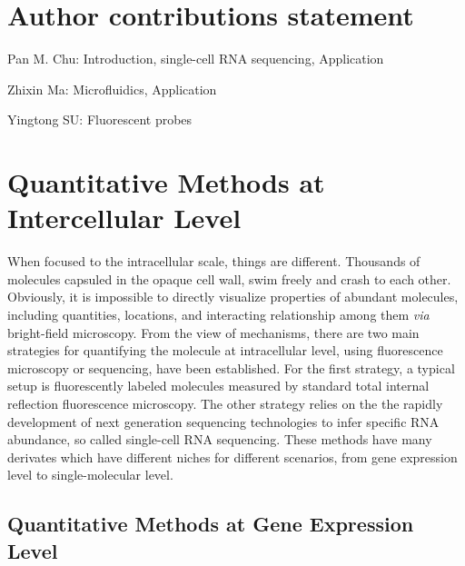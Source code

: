\documentclass[fleqn,10pt]{wlscirep}
\begin{document}





\section*{Author contributions statement}

Pan M. Chu: Introduction, single-cell RNA sequencing, Application

Zhixin Ma: Microfluidics, Application

Yingtong SU: Fluorescent probes

\section[]{Quantitative Methods at Intercellular Level}

When focused to the intracellular scale, things are different. Thousands of molecules capsuled in the opaque cell wall, swim freely and crash to each other. Obviously, it is impossible to directly visualize properties of abundant molecules, including quantities, locations, and interacting relationship among them \emph{via} bright-field microscopy. From the view of mechanisms, there are two main strategies for quantifying the molecule at intracellular level, using fluorescence microscopy or sequencing, have been established. For the first strategy, a typical setup is fluorescently labeled molecules measured by standard total internal reflection fluorescence microscopy. The other strategy relies on the the rapidly development of next generation sequencing technologies to infer specific RNA abundance, so called single-cell RNA sequencing. These methods have many derivates which have different niches for different scenarios, from gene expression level to single-molecular level.

\subsection[]{Quantitative Methods at Gene Expression Level}





\end{document}
